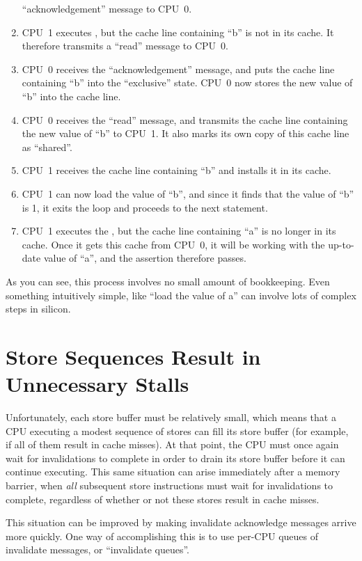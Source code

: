 \begin{enumerate}
	``acknowledgement'' message to CPU~0.
\item	CPU~1 executes , but the cache line
	containing ``b'' is not in its cache.
	It therefore transmits a ``read'' message to CPU~0.
\item	CPU~0 receives the ``acknowledgement'' message, and puts
	the cache line containing ``b'' into the ``exclusive'' state.
	CPU~0 now stores the new value of ``b'' into the cache line.
\item	CPU~0 receives the ``read'' message, and transmits the
	cache line containing the new value of ``b''
	to CPU~1.
	It also marks its own copy of this cache line as ``shared''.
\item	CPU~1 receives the cache line containing ``b'' and installs
	it in its cache.
\item	CPU~1 can now load the value of ``b'',
	and since it finds that the value of ``b'' is 1, it
	exits the  loop and proceeds
	to the next statement.
\item	CPU~1 executes the , but the cache line containing
	``a'' is no longer in its cache.
	Once it gets this cache from CPU~0, it will be
	working with the up-to-date value of ``a'', and the assertion
	therefore passes.
\end{enumerate}

As you can see, this process involves no small amount of bookkeeping.
Even something intuitively simple, like ``load the value of a'' can
involve lots of complex steps in silicon.

\section{Store Sequences Result in Unnecessary Stalls}
\label{sec:app:whymb:Store Sequences Result in Unnecessary Stalls}

Unfortunately, each store buffer must be relatively small, which means
that a CPU executing a modest sequence of stores can fill its store
buffer (for example, if all of them result in cache misses).
At that point, the CPU must once again wait for invalidations to complete
in order to drain its store buffer before it can continue executing.
This same situation can arise immediately after a memory barrier, when
\emph{all} subsequent store instructions must wait for invalidations to
complete, regardless of whether or not these stores result in cache misses.

This situation can be improved by making invalidate acknowledge
messages arrive more quickly.
One way of accomplishing this is to use per-CPU queues of
invalidate messages, or ``invalidate queues''.

